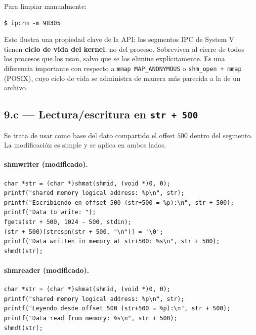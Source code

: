 \documentclass[11pt,a4paper]{article}
\begin{document}
Para limpiar manualmente:

\begin{lstlisting}[style=shellstyle]
$ ipcrm -m 98305
\end{lstlisting}

\begin{idea}
Esto ilustra una propiedad clave de la API: los segmentos IPC de
System V tienen \textbf{ciclo de vida del kernel}, no del proceso.
Sobreviven al cierre de todos los procesos que los usan, salvo que se
los elimine explícitamente. Es una diferencia importante con respecto
a \texttt{mmap MAP\_ANONYMOUS} o \texttt{shm\_open + mmap} (POSIX),
cuyo ciclo de vida se administra de manera más parecida a la de un
archivo.
\end{idea}

\subsection{9.c --- Lectura/escritura en \texttt{str + 500}}

Se trata de usar como base del dato compartido el offset $500$ dentro
del segmento. La modificación es simple y se aplica en ambos lados.

\paragraph{shmwriter (modificado).}

\begin{lstlisting}[style=cstyle]
char *str = (char *)shmat(shmid, (void *)0, 0);
printf("shared memory logical address: %p\n", str);
printf("Escribiendo en offset 500 (str+500 = %p):\n", str + 500);
printf("Data to write: ");
fgets(str + 500, 1024 - 500, stdin);
(str + 500)[strcspn(str + 500, "\n")] = '\0';
printf("Data written in memory at str+500: %s\n", str + 500);
shmdt(str);
\end{lstlisting}

\paragraph{shmreader (modificado).}

\begin{lstlisting}[style=cstyle]
char *str = (char *)shmat(shmid, (void *)0, 0);
printf("shared memory logical address: %p\n", str);
printf("Leyendo desde offset 500 (str+500 = %p):\n", str + 500);
printf("Data read from memory: %s\n", str + 500);
shmdt(str);
\end{lstlisting}
\end{document}
